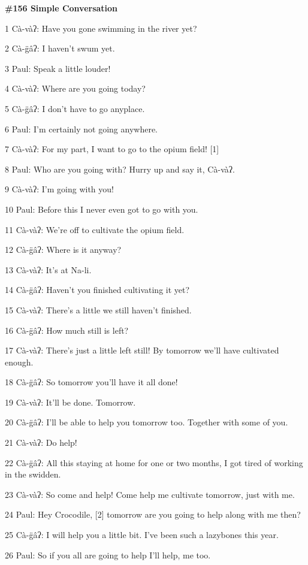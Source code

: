 
{\LARGE{}\textbf{\#156  Simple Conversation}}

{\LARGE{}1 Cà-vàʔ: Have you gone swimming in the river yet?}

{\LARGE{}2 Cà-g̈âʔ: I haven't swum yet.}

{\LARGE{}3 Paul: Speak a little louder!}

{\LARGE{}4 Cà-vàʔ: Where are you going today?}

{\LARGE{}5 Cà-g̈âʔ: I don't have to go anyplace.}

{\LARGE{}6 Paul: I'm certainly not going anywhere.}

{\LARGE{}7 Cà-vàʔ: For my part, I want to go to the opium field! [1]}

{\LARGE{}8 Paul: Who are you going with? Hurry up and say it, Cà-vàʔ.}

{\LARGE{}9 Cà-vàʔ: I'm going with you!}

{\LARGE{}10 Paul: Before this I never even got to go with you.}

{\LARGE{}11 Cà-vàʔ: We're off to cultivate the opium field.}

{\LARGE{}12 Cà-g̈âʔ: Where is it anyway?}

{\LARGE{}13 Cà-vàʔ: It's at Na-li.}

{\LARGE{}14 Cà-g̈âʔ: Haven't you finished cultivating it yet?}

{\LARGE{}15 Cà-vàʔ: There's a little we still haven't finished.}

{\LARGE{}16 Cà-g̈âʔ: How much still is left?}

{\LARGE{}17 Cà-vàʔ: There's just a little left still! By tomorrow we'll have
cultivated enough.}

{\LARGE{}18 Cà-g̈âʔ: So tomorrow you'll have it all done!}

{\LARGE{}19 Cà-vàʔ: It'll be done. Tomorrow.}

{\LARGE{}20 Cà-g̈âʔ: I'll be able to help you tomorrow too. Together with some
of you.}

{\LARGE{}21 Cà-vàʔ: Do help!}

{\LARGE{}22 Cà-g̈âʔ: All this staying at home for one or two months, I got
tired of working in the swidden.}

{\LARGE{}23 Cà-vàʔ: So come and help! Come help me cultivate tomorrow, just
with me.}

{\LARGE{}24 Paul: Hey Crocodile, [2] tomorrow are you going to help along with
me then?}

{\LARGE{}25 Cà-g̈âʔ: I will help you a little bit. I've been such a lazybones
this year.}

{\LARGE{}26 Paul: So if you all are going to help I'll help, me too.}

